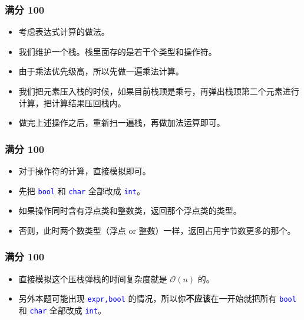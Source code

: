 \documentclass[aspectratio=169]{ctexbeamer}
\begin{document}
\begin{frame}
  \frametitle{满分 100}

  \begin{itemize}
    \item <1 - > 考虑表达式计算的做法。
    \item <2 - > 我们维护一个栈。栈里面存的是若干个类型和操作符。
    \item <3 - > 由于乘法优先级高，所以先做一遍乘法计算。
    \item <4 - > 我们把元素压入栈的时候，如果目前栈顶是乘号，再弹出栈顶第二个元素进行计算，把计算结果压回栈内。
    \item <5 - > 做完上述操作之后，重新扫一遍栈，再做加法运算即可。
  \end{itemize}

\end{frame}

\begin{frame}
  \frametitle{满分 100}

  \begin{itemize}
    \item <1 - > 对于操作符的计算，直接模拟即可。
    \item <2 - > 先把 \textcolor{blue}{\texttt{bool}} 和 \textcolor{blue}{\texttt{char}} 全部改成 \textcolor{blue}{\texttt{int}}。
    \item <3 - > 如果操作同时含有浮点类和整数类，返回那个浮点类的类型。
    \item <4 - > 否则，此时两个数类型（浮点 or 整数）一样，返回占用字节数更多的那个。
  \end{itemize}

\end{frame}

\begin{frame}
  \frametitle{满分 100}

  \begin{itemize}
    \item <1 - > 直接模拟这个压栈弹栈的时间复杂度就是 $\mathcal O(n)$ 的。
    \item <2 - > 另外本题可能出现 \textcolor{blue}{\texttt{expr,bool}} 的情况，所以你\textbf{不应该}在一开始就把所有 \textcolor{blue}{\texttt{bool}} 和 \textcolor{blue}{\texttt{char}} 全部改成 \textcolor{blue}{\texttt{int}}。
  \end{itemize}

\end{frame}
\end{document}
